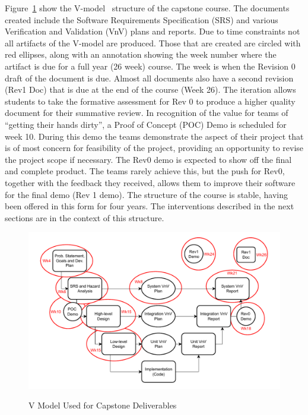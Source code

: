 \documentclass[10pt, conference]{IEEEtran}
\begin{document}
Figure~\ref{Fig_VModel} show the V-model~\cite{ForsbergAndMooz1991} structure of the
capstone course. The documents created include the Software Requirements
Specification (SRS) and various Verification and Validation (VnV) plans and
reports. Due to time constraints not all artifacts of the V-model are produced.
Those that are created are circled with red ellipses, along with an annotation
showing the week number where the artifact is due for a full year (26 week)
course. The week is when the Revision 0 draft of the document is due.  Almost
all documents also have a second revision (Rev1 Doc) that is due at the end of
the course (Week 26). The iteration allows students to take the formative
assessment for Rev 0 to produce a higher quality document for their summative
review. In recognition of the value for teams of ``getting their hands dirty'',
a Proof of Concept (POC) Demo is scheduled for week 10. During this demo the
teams demonstrate the aspect of their project that is of most concern for
feasibility of the project, providing an opportunity to revise the project scope
if necessary. The Rev0 demo is expected to show off the final and complete
product. The teams rarely achieve this, but the push for Rev0, together with the
feedback they received, allows them to improve their software for the final demo
(Rev 1 demo). The structure of the course is stable, having been offered in this
form for four years. The interventions described in the next sections are in the
context of this structure. 

\begin{figure}[h!]
  \begin{center}
    {
      \includegraphics[width=1.1\columnwidth]{./figures/CourseStructure.drawio.pdf}
    }
    \caption{\label{Fig_VModel} V Model Used for Capstone Deliverables}
  \end{center}
\end{figure}
\end{document}

